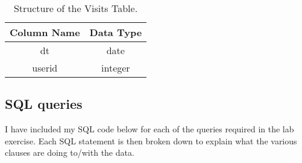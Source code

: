 \documentclass[]{article}
\begin{document}
\begin{table}[!ht]
	\begin{center}
		\caption{Structure of the Visits Table.}
		\label{tab:table1}
		\begin{tabular}{|c|c|} 
			\hline
			\textbf{Column Name} & \textbf{Data Type}\\
			\hline
			dt & date \\
			userid & integer \\
			\hline
		\end{tabular}
	\end{center}
\end{table}


\subsection{SQL queries}
I have included my SQL code below for each of the queries required in the lab exercise.  Each SQL statement is then broken down to explain what the various clauses are doing to/with the data.
\end{document}
